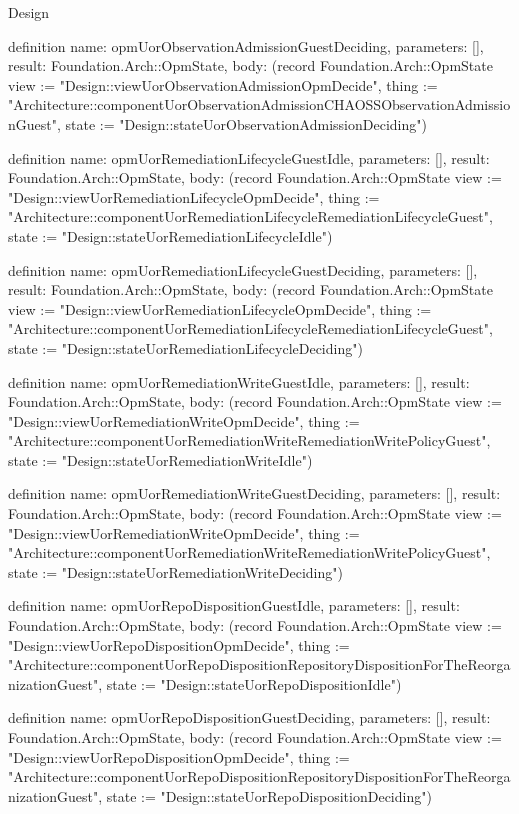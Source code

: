 \begin{lexlean}{Design}
\begin{semanticmodule}
definition{
  name: opmUorObservationAdmissionGuestDeciding,
  parameters: [],
  result: Foundation.Arch::OpmState,
  body: (record Foundation.Arch::OpmState {view := "Design::viewUorObservationAdmissionOpmDecide", thing := "Architecture::componentUorObservationAdmissionCHAOSSObservationAdmissionGuest", state := "Design::stateUorObservationAdmissionDeciding"})
}

definition{
  name: opmUorRemediationLifecycleGuestIdle,
  parameters: [],
  result: Foundation.Arch::OpmState,
  body: (record Foundation.Arch::OpmState {view := "Design::viewUorRemediationLifecycleOpmDecide", thing := "Architecture::componentUorRemediationLifecycleRemediationLifecycleGuest", state := "Design::stateUorRemediationLifecycleIdle"})
}

definition{
  name: opmUorRemediationLifecycleGuestDeciding,
  parameters: [],
  result: Foundation.Arch::OpmState,
  body: (record Foundation.Arch::OpmState {view := "Design::viewUorRemediationLifecycleOpmDecide", thing := "Architecture::componentUorRemediationLifecycleRemediationLifecycleGuest", state := "Design::stateUorRemediationLifecycleDeciding"})
}

definition{
  name: opmUorRemediationWriteGuestIdle,
  parameters: [],
  result: Foundation.Arch::OpmState,
  body: (record Foundation.Arch::OpmState {view := "Design::viewUorRemediationWriteOpmDecide", thing := "Architecture::componentUorRemediationWriteRemediationWritePolicyGuest", state := "Design::stateUorRemediationWriteIdle"})
}

definition{
  name: opmUorRemediationWriteGuestDeciding,
  parameters: [],
  result: Foundation.Arch::OpmState,
  body: (record Foundation.Arch::OpmState {view := "Design::viewUorRemediationWriteOpmDecide", thing := "Architecture::componentUorRemediationWriteRemediationWritePolicyGuest", state := "Design::stateUorRemediationWriteDeciding"})
}

definition{
  name: opmUorRepoDispositionGuestIdle,
  parameters: [],
  result: Foundation.Arch::OpmState,
  body: (record Foundation.Arch::OpmState {view := "Design::viewUorRepoDispositionOpmDecide", thing := "Architecture::componentUorRepoDispositionRepositoryDispositionForTheReorganizationGuest", state := "Design::stateUorRepoDispositionIdle"})
}

definition{
  name: opmUorRepoDispositionGuestDeciding,
  parameters: [],
  result: Foundation.Arch::OpmState,
  body: (record Foundation.Arch::OpmState {view := "Design::viewUorRepoDispositionOpmDecide", thing := "Architecture::componentUorRepoDispositionRepositoryDispositionForTheReorganizationGuest", state := "Design::stateUorRepoDispositionDeciding"})
}


\end{semanticmodule}
\end{lexlean}
